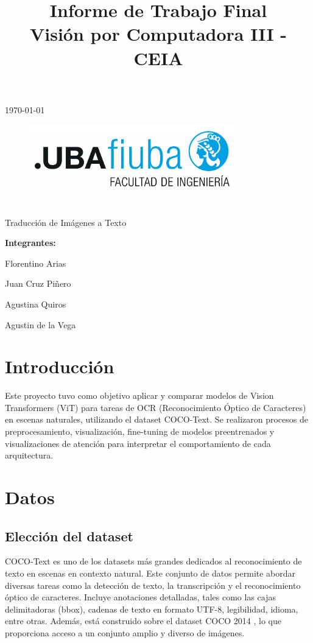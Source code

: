 \documentclass[12pt]{article}
\title{\Huge Informe de Trabajo Final\\Visión por Computadora III - CEIA}
\newcommand{\subtitle}{\Large Traducción de Imágenes a Texto}
\begin{document}
\begin{center}
    {\small \today}  %
\end{center}

\begin{figure}[t]
    \centering
    \includegraphics[width=0.8\textwidth]{../reports/figures/logoFIUBA.pdf}
\end{figure}

\begin{center}
    {\LARGE \textbf{\thetitle}}\\[1em]
    {\large \subtitle}
\end{center}

\vspace{2cm}

\begin{flushright}
{\Large
\textbf{Integrantes:}\par
 Florentino Arias\par
 Juan Cruz Piñero\par
 Agustina Quiros\par
 Agustin de la Vega
}
\end{flushright}

\newpage

\section{Introducción}
Este proyecto tuvo como objetivo aplicar y comparar modelos de Vision Transformers (ViT) para tareas
de OCR (Reconocimiento Óptico de Caracteres) en escenas naturales, utilizando el dataset COCO-Text.
Se realizaron procesos de preprocesamiento, visualización, fine-tuning de modelos preentrenados y visualizaciones
de atención para interpretar el comportamiento de cada arquitectura.


\section{Datos}
\subsection{Elección del dataset}
COCO-Text \cite{cocotext} es uno de los datasets más grandes dedicados al reconocimiento de texto en escenas en contexto natural.
Este conjunto de datos permite abordar diversas tareas como la detección de texto, la transcripción y el 
reconocimiento óptico de caracteres. Incluye anotaciones detalladas, tales como las cajas delimitadoras 
(bbox), cadenas de texto en formato UTF-8, legibilidad, idioma, entre otras. Además, está construido 
sobre el dataset COCO 2014 \cite{coco2014}, lo que proporciona acceso a un conjunto amplio y diverso de imágenes.
\end{document}
